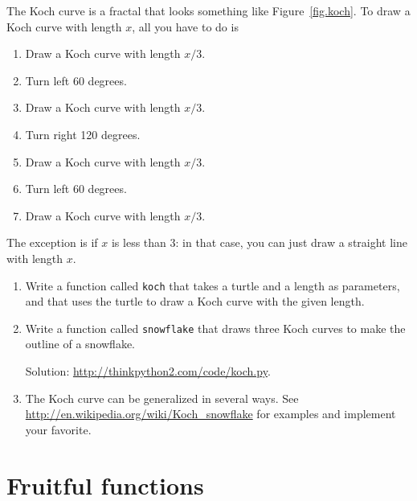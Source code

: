 \documentclass[10pt]{book}
\begin{document}
\begin{exercise}

The Koch curve is a fractal that looks something like
Figure~\ref{fig.koch}.  To draw a Koch curve with length $x$, all you
have to do is

\begin{enumerate}

\item Draw a Koch curve with length $x/3$.

\item Turn left 60 degrees.

\item Draw a Koch curve with length $x/3$.

\item Turn right 120 degrees.

\item Draw a Koch curve with length $x/3$.

\item Turn left 60 degrees.

\item Draw a Koch curve with length $x/3$.

\end{enumerate}

The exception is if $x$ is less than 3: in that case,
you can just draw a straight line with length $x$.

\begin{enumerate}

\item Write a function called {\tt koch} that takes a turtle and
a length as parameters, and that uses the turtle to draw a Koch
curve with the given length.

\item Write a function called {\tt snowflake} that draws three
Koch curves to make the outline of a snowflake.

Solution: \url{http://thinkpython2.com/code/koch.py}.

\item The Koch curve can be generalized in several ways.  See
\url{http://en.wikipedia.org/wiki/Koch_snowflake} for examples and
implement your favorite.

\end{enumerate}
\end{exercise}


\chapter{Fruitful functions}
\label{fruitchap}
\end{document}

